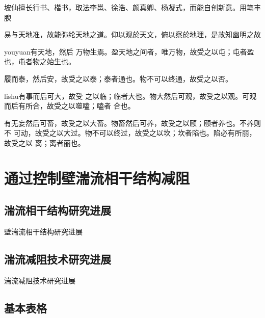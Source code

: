 {\kaishu 坡仙擅长行书、楷书，取法李邕、徐浩、颜真卿、杨凝式，而能自创新意。用笔丰腴}

{\fangsong 易与天地准，故能弥纶天地之道。仰以观於天文，俯以察於地理，是故知幽明之故}

{\ifcsname youyuan\endcsname\youyuan\else[无 \cs{youyuan} 字体。]\fi 有天地，然后
  万物生焉。盈天地之间者，唯万物，故受之以屯；屯者盈也，屯者物之始生也。}

{\heiti 履而泰，然后安，故受之以泰；泰者通也。物不可以终通，故受之以否。}

{\ifcsname lishu\endcsname\lishu\else[无 \cs{lishu} 字体。]\fi 有事而后可大，故受
  之以临；临者大也。物大然后可观，故受之以观。可观而后有所合，故受之以噬嗑；嗑者
  合也。}

{\songti 有无妄然后可畜，故受之以大畜。物畜然后可养，故受之以颐；颐者养也。不养则不
  可动，故受之以大过。物不可以终过，故受之以坎；坎者陷也。陷必有所丽，故受之以
  离；离者丽也。}

\section{通过控制壁湍流相干结构减阻}
\subsection{湍流相干结构研究进展}
壁湍流相干结构研究进展
\subsection{湍流减阻技术研究进展}
\label{chap1:sample:table}
湍流减阻技术研究进展
\subsection{基本表格}
\label{sec:basictable}

